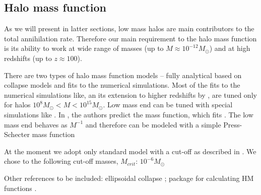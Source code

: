 \subsection{Halo mass function}

As we will present in latter sections, low mass halos are main contributors to the total annihilation rate. Therefore our main requirement to the halo mass function is its ability to work at wide range of masses (up to $M \approx 10^{-12}M_\odot$) and at high redshifts (up to $z \approx 100$). 

There are two types of halo mass function models -- fully analytical based on collapse models and fits to the numerical simulations. Most of the fits to the numerical simulations like, \citet{Tinker_2008} an its extension to higher redshifts by \citet{Behroozi_2013}, are tuned only for halos $10^{8}M_\odot < M < 10^{15}M_\odot$. Low mass end can be tuned with special simulations like \cite{Diemand_2005}. In \cite{Schneider_2013}, the authors predict the mass function, which fits \cite{Diemand_2005}. The low mass end behaves as $M^{-1}$ and therefore can be modeled with a simple Press-Schecter mass function \citep{Press_1974}

At the moment we adopt only standard \citet{Press_1974} model with a cut-off as described in \cite{Diemand_2005}. We chose to the following cut-off masses, $M_{crit}$: $10^{-6}M_\odot$

Other references to be included:
ellipsoidal collapse \citep{Sheth_2001}; package for calculating HM functions \cite{Murray_2013}.


